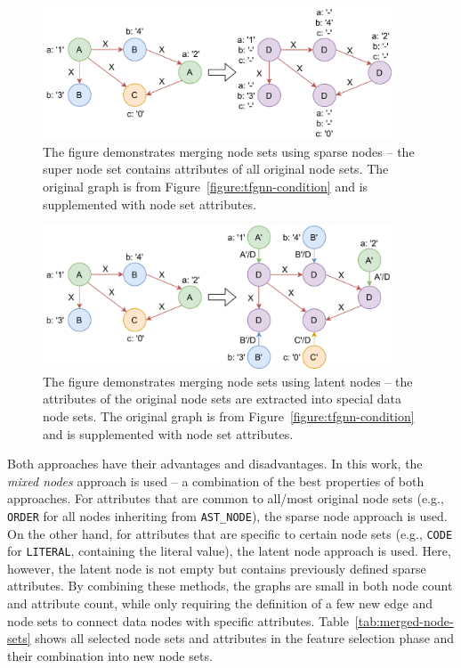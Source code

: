 \begin{figure}[t]
	\centering
	\includegraphics[width=0.93\textwidth]{figures/sparse-nodes.pdf}
	\caption{The figure demonstrates merging node sets using sparse nodes -- the super node set contains attributes of all original node sets. The original graph is from Figure~\ref{figure:tfgnn-condition} and is supplemented with node set attributes.}
	\label{figure:sparse-nodes}
\end{figure}

\begin{figure}[t]
	\centering
	\includegraphics[width=0.93\textwidth]{figures/latent-nodes.pdf}
	\caption{The figure demonstrates merging node sets using latent nodes -- the attributes of the original node sets are extracted into special data node sets. The original graph is from Figure~\ref{figure:tfgnn-condition} and is supplemented with node set attributes.}
	\label{figure:latent-nodes}
\end{figure}

Both approaches have their advantages and disadvantages. In this work, the \textit{mixed nodes} approach is used -- a combination of the best properties of both approaches. For attributes that are common to all/most original node sets (e.g., \texttt{ORDER} for all nodes inheriting from \texttt{AST\_NODE}), the sparse node approach is used. On the other hand, for attributes that are specific to certain node sets (e.g., \texttt{CODE} for \texttt{LITERAL}, containing the literal value), the latent node approach is used. Here, however, the latent node is not empty but contains previously defined sparse attributes. By combining these methods, the graphs are small in both node count and attribute count, while only requiring the definition of a few new edge and node sets to connect data nodes with specific attributes. Table~\ref{tab:merged-node-sets} shows all selected node sets and attributes in the feature selection phase and their combination into new node sets.

